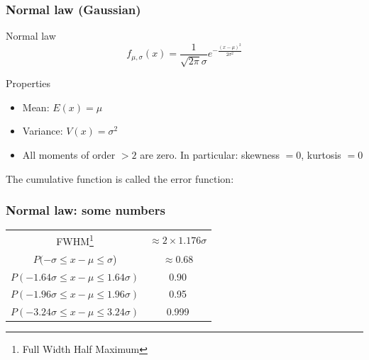 \documentclass[9pt]{beamer}
\newif\ifmynote
\newcommand\mynote[1]{%
\ifmynote \textbf{#1} \else \fi
}
\begin{document}
\begin{frame}
 \frametitle{Normal law (Gaussian)}
 
 \mynote{Écrire au tableau}
 
 \begin{block}{Normal law}
  $$f_{\mu,\sigma} (x) = \frac{1}{\sqrt{2\pi} \sigma} e^{-\frac{(x-\mu)^2}{2\sigma^2}}$$
 \end{block}
 
 \begin{block}{Properties}
  \begin{itemize}
   \item Mean: $E(x) = \mu$
   \item Variance: $V(x) = \sigma^2$
   \item All moments of order $>2$ are zero. In particular: skewness $=0$, kurtosis $=0$
  \end{itemize}
 \end{block}

 The cumulative function is called the error function: 

\end{frame}

\begin{frame}
 \frametitle{Normal law: some numbers}
 
 \mynote{Écrire au tableau}
 
 \begin{center}
  \begin{tabular}{c|c}
   FWHM\footnote{Full Width Half Maximum} & $\approx 2 \times 1.176 \sigma$ \\
   $P(-\sigma \leq x-\mu \leq \sigma$) & $\approx 0.68$ \\
   $P(-1.64 \sigma \leq x-\mu \leq 1.64 \sigma)$ & 0.90 \\
   $P(-1.96 \sigma \leq x-\mu \leq 1.96 \sigma)$ & 0.95 \\
   $P(-3.24 \sigma \leq x-\mu \leq 3.24 \sigma)$ & 0.999 
  \end{tabular}

 \end{center}

\end{frame}
\end{document}
